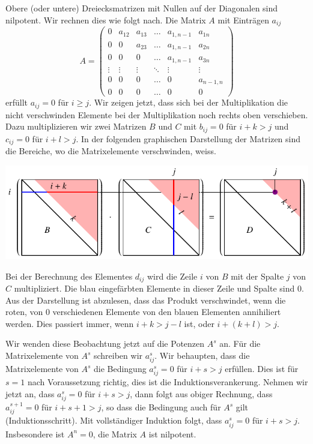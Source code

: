 \begin{beispiel}
Obere (oder untere) Dreiecksmatrizen mit Nullen auf der Diagonalen
sind nilpotent.
%
Wir rechnen dies wie folgt nach.
Die Matrix $A$ mit Einträgen $a_{i\!j}$
\[
A=\begin{pmatrix}
  0   &a_{12}&a_{13}&\dots &a_{1,n-1}&a_{1n}   \\
  0   &  0   &a_{23}&\dots &a_{1,n-1}&a_{2n}   \\
  0   &  0   &  0   &\dots &a_{1,n-1}&a_{3n}   \\
\vdots&\vdots&\vdots&\ddots&\vdots   &\vdots   \\
  0   &  0   &  0   &\dots &  0      &a_{n-1,n}\\
  0   &  0   &  0   &\dots &  0      &  0
\end{pmatrix}
\]
erfüllt $a_{i\!j}=0$ für $i\ge j$.
Wir zeigen jetzt, dass sich bei der Multiplikation die nicht
verschwinden Elemente bei der Multiplikation noch rechts oben
verschieben.
Dazu multiplizieren wir zwei Matrizen $B$ und $C$ mit
$b_{i\!j}=0$ für $i+k>j$ und $c_{i\!j}=0$ für $i+l>j$.
In der folgenden graphischen Darstellung der Matrizen sind die
Bereiche, wo die Matrixelemente verschwinden, weiss.
\begin{center}
\includegraphics{chapters/40-eigenwerte/images/nilpotent.pdf}
\end{center}
Bei der Berechnung des Elementes $d_{i\!j}$ wird die Zeile $i$ von $B$
mit der Spalte $j$ von $C$ multipliziert.
Die blau eingefärbten Elemente in dieser Zeile und Spalte sind $0$.
Aus der Darstellung ist abzulesen, dass das Produkt verschwindet, 
wenn die roten, von $0$ verschiedenen Elemente von den blauen
Elementen annihiliert werden.
Dies passiert immer, wenn $i+k>j-l$ ist, oder $i+(k+l)> j$.

Wir wenden diese Beobachtung jetzt auf die Potenzen $A^s$ an.
Für die Matrixelemente von $A^s$ schreiben wir $a^s_{i\!j}$.
Wir behaupten, dass die Matrixelemente von $A^s$ die Bedingung
$a_{i\!j}^s=0$ für $i+s>j$ erfüllen.
Dies ist für $s=1$ nach Voraussetzung richtig, dies ist die
Induktionsverankerung.
Nehmen wir jetzt an, dass $a_{i\!j}^s=0$ für $i+s>j$, dann folgt
aus obiger Rechnung, dass $a_{i\!j}^{s+1}=0$ für $i+s+1>j$, so
dass die Bedingung auch für $A^s$ gilt (Induktionsschritt).
Mit vollständiger Induktion folgt, dass $a_{i\!j}^s=0$ für $i+s>j$.
Insbesondere ist $A^n=0$, die Matrix $A$ ist nilpotent.
\end{beispiel}


